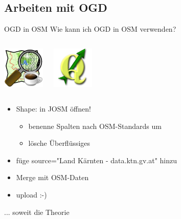 \documentclass{beamer}
\begin{document}
\subsection{Arbeiten mit OGD}

\begin{frame}{OGD in OSM}
	Wie kann ich OGD in OSM verwenden?

	\begin{columns}[c] 
		\begin{center}
			\includegraphics[width=2cm]{josm-latest.png}
		\end{center}
		\begin{center}
			\includegraphics[width=2cm]{qgis-icon.png}
		\end{center}
	\end{columns}


	\begin{itemize}
		\item Shape: in JOSM öffnen!
		\pause
		\begin{itemize}
			\item benenne Spalten nach OSM-Standards um
			\item lösche Überflüssiges
		\end{itemize}
		\item füge source="Land Kärnten - data.ktn.gv.at" hinzu
		\item Merge mit OSM-Daten
		\item upload :-)
	\end{itemize}
	\pause
	\hfill ... soweit die Theorie

\end{frame}
\end{document}
